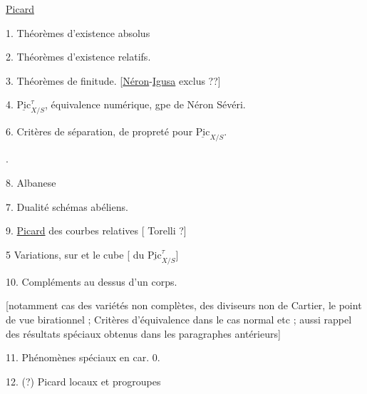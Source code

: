 \uline{Picard}

1. Théorèmes d'existence absolus

2. Théorèmes d'existence relatifs.

\noindent{}3.  Théorèmes de finitude. [\uline{Néron}-\uline{Igusa} exclus ??]

4. $\underline{\mathrm{Pic}}^{\tau}_{X/S}$, équivalence numérique, gpe de Néron Sévéri.

6. Critères de  séparation, de propreté pour $\underline{\mathrm{Pic}}_{X/S}$.

 .

8. Albanese

7. Dualité schémas abéliens.

9. \uline{Picard} des courbes relatives [ Torelli ?]

5  Variations, sur   et le cube [ du $\underline{\mathrm{Pic}}^{\tau}_{X/S}$]

10. Compléments au dessus d'un corps.

[notamment cas des variétés non complètes, des diviseurs non de Cartier, le point de vue birationnel ; \deleted{\unsure{etc.]}} Critères d'équivalence dans le cas normal etc \deleted{\unsure{etc]}} ; aussi rappel des résultats spéciaux obtenus dans les paragraphes antérieurs]

11. Phénomènes spéciaux en car. 0.

12. (?) Picard locaux et progroupes \unsure{---|\ldots}


